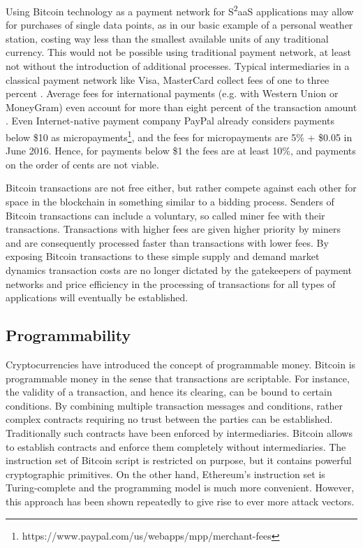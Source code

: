 Using Bitcoin technology as a payment network for S\textsuperscript{2}aaS applications may allow for purchases of single data points, as in our basic example of a personal weather station, costing way less than the smallest available units of any traditional currency. This would not be possible using traditional payment network, at least not without the introduction of additional processes. Typical intermediaries in a classical payment network like Visa, MasterCard collect fees of one to three percent \parencite{chakravorti2003theory}. Average fees for international payments (e.g. with Western Union or MoneyGram) even account for more than eight percent of the transaction amount \parencite{remittances}. Even Internet-native payment company PayPal already considers payments below \$10 as micropayments\footnote{https://www.paypal.com/us/webapps/mpp/merchant-fees}, and the fees for micropayments are 5\% + \$0.05 in June 2016. Hence, for payments below \$1 the fees are at least 10\%, and payments on the order of cents are not viable.

Bitcoin transactions are not free either, but rather compete against each other for space in the blockchain in something similar to a bidding process. Senders of Bitcoin transactions can include a voluntary, so called miner fee with their transactions. Transactions with higher fees are given higher priority by miners and are consequently processed faster than transactions with lower fees. By exposing Bitcoin transactions to these simple supply and demand market dynamics transaction costs are no longer dictated by the gatekeepers of payment networks and price efficiency in the processing of transactions for all types of applications will eventually be established.

\subsection{Programmability}
\label{subsec:script}

Cryptocurrencies have introduced the concept of programmable money.
Bitcoin is programmable money in the sense that transactions are scriptable. For instance, the validity of a transaction, and hence its clearing, can be bound to certain conditions. By combining multiple transaction messages and conditions, rather complex contracts requiring no trust between the parties can be established. Traditionally such contracts have been enforced by intermediaries. Bitcoin allows to establish contracts and enforce them completely without intermediaries. The instruction set of Bitcoin script is restricted on purpose, but it contains powerful cryptographic primitives. On the other hand, Ethereum's instruction set is Turing-complete and the programming model is much more convenient. However, this approach has been shown repeatedly to give rise to ever more attack vectors. 

